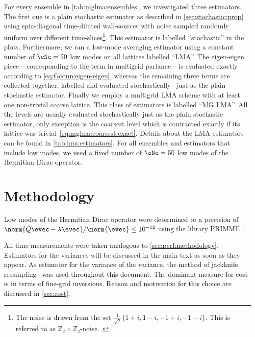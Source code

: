For every ensemble in \cref{tab:mglma:ensembles}, we investigated three estimators.
The first one is a plain stochastic estimator as described in \cref{sec:stochastic:prop} using spin-diagonal time-diluted wall-sources with noise sampled randomly uniform over different time-slices\footnote{
The noise is drawn from the set $\frac{1}{\sqrt{2}} \{1+i, 1-i, -1+i, -1-i\}$.
This is referred to as $\mathbb{Z}_2 \times \mathbb{Z}_2$-noise~\cite{ETM:2008zte}.
}.
This estimator is labelled ``stochastic'' in the plots.
Furthermore, we ran a low-mode averaging estimator using a constant number of $\cNc=50$ low modes on all lattices labelled ``LMA''.
The eigen-eigen piece -- corresponding to the  term in multigrid parlance -- is evaluated exactly according to \cref{eq:Gconn:eigen-eigen}, whereas the remaining three terms are collected together, labelled  and evaluated stochastically~\cite{lynch2023} just as the plain stochastic estimator.
Finally we employ a multigrid LMA scheme with at least one non-trivial coarse lattice.
This class of estimators is labelled ``MG LMA''.
All the levels are usually evaluated stochastically just as the plain stochastic estimator, only exception is the coarsest level which is contracted exactly if its lattice was trivial~\cref{eq:mglma:coarsest:exact}.
Details about the LMA estimators can be found in \cref{tab:lma:estimators}.
For all ensembles and estimators that include low modes, we used a fixed number of $\cNc=50$ low modes of the Hermitian Dirac operator.

\section{Methodology}
\label{sec:numerics:methodology}

Low modes of the Hermitian Dirac operator were determined to a precision of $\norm{Q \evec - \lambda \evec} / \norm{\evec} \leq 10^{-12}$ using the library PRIMME~\cite{primme}.


All time measurements were taken analogous to \cref{sec:perf:methodology}.
Estimators for the variances will be discussed in the main text as soon as they appear.
As estimator for the variance of the variance, the method of jackknife resampling~\cite{efron1982jackknife,shao2012jackknife} was used throughout this document.
The dominant measure for cost is in terms of fine-grid inversions.
Reason and motivation for this choice are discussed in \cref{sec:cost}.

